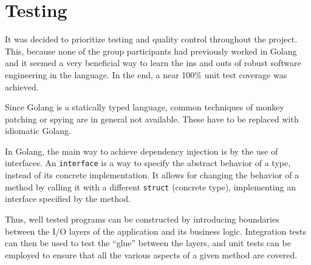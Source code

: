 \section{Testing}\label{sec:testing}

It was decided to prioritize testing and quality control throughout the
project. This, because none of the group participants had previously
worked in Golang and it seemed a very beneficial way to learn the ins
and outs of robust software engineering in the language. In the end,
a near 100\% unit test coverage was achieved.

Since Golang is a statically typed language, common techniques of monkey
patching or spying are in general not available.  These have to be
replaced with idiomatic Golang. 

In Golang, the main way to achieve dependency injection is by
the use of interfaces. An \texttt{interface} is a way to specify
the abstract behavior of a type, instead of its concrete implementation.
It allows for changing the behavior of a method by calling it with a
different \texttt{struct} (concrete type), implementing an
interface specified by the method.

Thus, well tested programs can be constructed by introducing boundaries
between the I/O layers of the application and its business logic.
Integration tests can then be used to test the ``glue''  between the
layers, and unit tests can be employed to ensure that all the various
aspects of a given method are covered.
